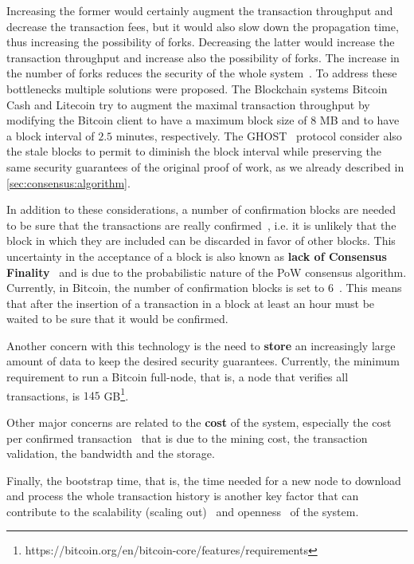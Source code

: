 Increasing the former would certainly augment the transaction throughput and
decrease the transaction fees, but it would also slow down the propagation time,
thus increasing the possibility of forks. Decreasing the latter would increase
the transaction throughput and increase also the possibility of forks. The
increase in the number of forks reduces the security of the whole
system~\cite{bib:ghost}. To address these bottlenecks multiple solutions were
proposed. The Blockchain systems Bitcoin Cash and Litecoin try to augment the
maximal transaction throughput by modifying the Bitcoin client to have a maximum
block size of $8$ MB and to have a block interval of $2.5$ minutes,
respectively. The GHOST~\cite{bib:ghost} protocol consider also the stale blocks
to permit to diminish the block interval while preserving the same security
guarantees of the original proof of work, as we already described in
\autoref{sec:consensus:algorithm}.

In addition to these considerations, a number of confirmation blocks are needed
to be sure that the transactions are really confirmed~\cite{bib:taxonomy}, i.e.
it is unlikely that the block in which they are included can be discarded in
favor of other blocks. This uncertainty in the acceptance of a block is also
known as \textbf{lack of Consensus Finality}~\cite{bib:the-quest} and is due to
the probabilistic nature of the PoW consensus algorithm. Currently, in Bitcoin,
the number of confirmation blocks is set to $6$~\cite{bib:masteringbitcoin}.
This means that after the insertion of a transaction in a block at least an hour
must be waited to be sure that it would be confirmed.

Another concern with this technology is the need to \textbf{store} an
increasingly large amount of data to keep the desired security guarantees.
Currently, the minimum requirement to run a Bitcoin full-node, that is, a node
that verifies all transactions, is $145$
GB\footnote{https://bitcoin.org/en/bitcoin-core/features/requirements}.

Other major concerns are related to the \textbf{cost} of the system, especially
the cost per confirmed transaction~\cite{bib:scaling-croman} that is due to the
mining cost, the transaction validation, the bandwidth and the storage.

Finally, the bootstrap time, that is, the time needed
for a new node to download and process the whole transaction history is another
key factor that can contribute to the scalability (scaling
out)~\cite{bib:scaling-croman} and openness~\cite{van2017distributed} of the
system.

